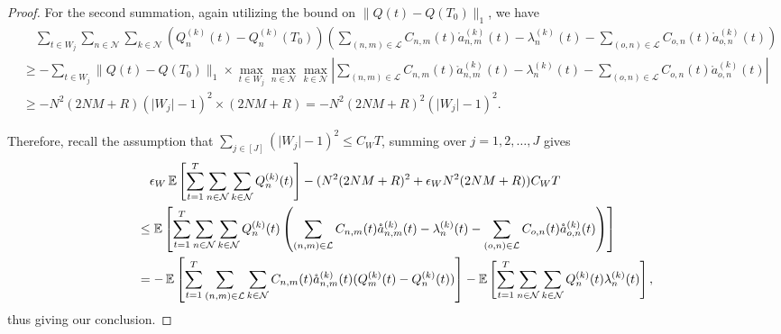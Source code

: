 \documentclass[11pt,fullpage,letterpaper]{article} %
\renewcommand{\bm}[1]{#1}%
\newcommand{\E}{\operatornamewithlimits{\mathbb{E}}}
\newcommand{\mN}{{\mathcal N}}
\newcommand{\mL}{{\mathcal L}}
\begin{document}
\begin{proof}
For the second summation, again utilizing the bound on $\lVert \bm Q(t)-\bm Q(T_0)\rVert_1$, we have
\begin{align*}
&\quad \sum_{t\in W_j} \sum_{n\in \mN} \sum_{k\in \mN} \left (Q_n^{(k)}(t)-Q_n^{(k)}(T_0)\right )\left (\sum_{(n,m)\in \mL} C_{n,m}(t) \mathring a_{n,m}^{(k)}(t) - \lambda_n^{(k)}(t) - \sum_{(o,n)\in \mL} C_{o,n}(t) \mathring a_{o,n}^{(k)}(t)\right )\\
&\ge -\sum_{t\in W_j} \lVert \bm Q(t)-\bm Q(T_0)\rVert_1\times \max_{t\in W_j} \max_{n\in \mN} \max_{k\in \mN} \left \lvert \sum_{(n,m)\in \mL} C_{n,m}(t) \mathring a_{n,m}^{(k)}(t) - \lambda_n^{(k)}(t) - \sum_{(o,n)\in \mL} C_{o,n}(t) \mathring a_{o,n}^{(k)}(t) \right \rvert \\
&\ge -N^2 (2NM+R) (\lvert W_j\rvert-1)^2\times (2NM+R)=-N^2 (2NM+R)^2 (\lvert W_j\rvert-1)^2.
\end{align*}

Therefore, recall the assumption that $\sum_{j\in [J]}(\lvert W_j\rvert-1)^2\le C_W T$, summing over $j=1,2,\ldots,J$ gives
\begin{align*}
&\quad \epsilon_W \E\left [\sum_{t=1}^T \sum_{n\in \mN} \sum_{k\in \mN} Q_n^{(k)}(t)\right ] - (N^2 (2NM+R)^2 + \epsilon_W N^2 (2NM+R)) C_W T \\
&\le \E\left [\sum_{t=1}^T \sum_{n\in \mN} \sum_{k\in \mN} Q_n^{(k)}(t)\left (\sum_{(n,m)\in \mL} C_{n,m}(t) \mathring a_{n,m}^{(k)}(t) - \lambda_n^{(k)}(t) - \sum_{(o,n)\in \mL} C_{o,n}(t) \mathring a_{o,n}^{(k)}(t)\right )\right ] \nonumber\\
&=-\E\left [\sum_{t=1}^T \sum_{(n,m)\in \mL} \sum_{k\in \mN} C_{n,m}(t) \mathring{a}_{n,m}^{(k)}(t) (Q_m^{(k)}(t) - Q_n^{(k)}(t))\right ]-\E\left [\sum_{t=1}^T \sum_{n\in \mN} \sum_{k\in \mN} Q_n^{(k)}(t) \lambda_n^{(k)}(t)\right ],
\end{align*}
thus giving our conclusion.
\end{proof}
\end{document}
